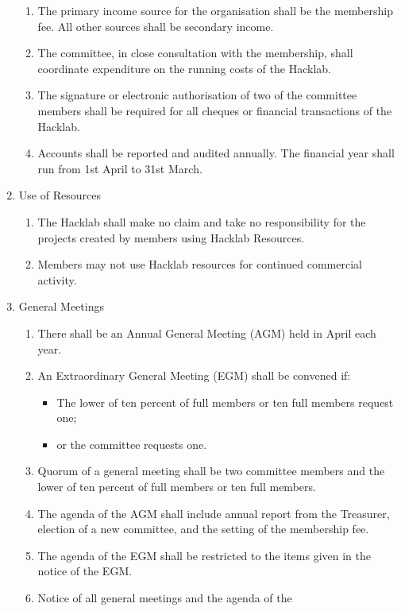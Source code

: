 \documentclass{article}
\begin{document}
\begin{enumerate}
\begin{enumerate}
    \item The primary income source for the organisation shall be
      the membership fee. All other sources shall be secondary income.
    \item The committee, in close consultation with the membership, shall
      coordinate expenditure on the running costs of the Hacklab.
    \item The signature or electronic authorisation of two of the
      committee members shall be required for all cheques or
      financial transactions of the Hacklab.
    \item Accounts shall be reported and audited annually. The
      financial year shall run from 1st April to 31st March.
    \end{enumerate}
    \item Use of Resources
      \begin{enumerate}
      \item The Hacklab shall make no claim and take no responsibility
        for the projects created by members using Hacklab Resources.
      \item Members may not use Hacklab resources for continued
        commercial activity.
      \end{enumerate}
    \item General Meetings
      \begin{enumerate}
      \item There shall be an Annual General Meeting (AGM) held in
        April each year.
      \item An Extraordinary General Meeting (EGM) shall be convened if:
        \begin{itemize}
        \item The lower of ten percent of full members or ten full
          members request one;
        \item or the committee requests one.
        \end{itemize}
      \item Quorum of a general meeting shall be two committee members
        and the lower of ten percent of full members or ten full
        members.
      \item The agenda of the AGM shall include annual report from the
        Treasurer, election of a new committee, and the setting of the
        membership fee.
      \item The agenda of the EGM shall be restricted to the items
        given in the notice of the EGM.
      \item Notice of all general meetings and the agenda of the

\end{enumerate}
\end{enumerate}
\end{document}

